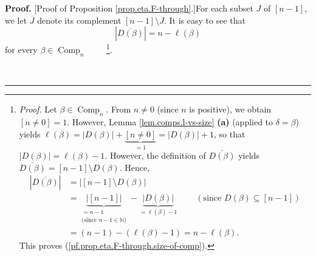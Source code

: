 \documentclass[numbers=enddot,12pt,final,onecolumn,notitlepage]{scrartcl}%
\theoremstyle{definition}
\newenvironment{proof}[1][Proof]{\noindent\textbf{#1.} }{\ \rule{0.5em}{0.5em}}
\newenvironment{vershort}{}{}
\begin{document}
\begin{vershort}


\begin{proof}
[Proof of Proposition \ref{prop.eta.F-through}.]For each subset $J$ of
$\left[  n-1\right]  $, we let $\overline{J}$ denote its complement $\left[
n-1\right]  \setminus J$. It is easy to see that%
\begin{equation}
\left\vert \overline{D\left(  \beta\right)  }\right\vert =n-\ell\left(
\beta\right)  \label{pf.prop.eta.F-through.size-of-comp}%
\end{equation}
for every $\beta\in\operatorname*{Comp}\nolimits_{n}$%
\ \ \ \ \footnote{\textit{Proof.} Let $\beta\in\operatorname*{Comp}%
\nolimits_{n}$. From $n\neq0$ (since $n$ is positive), we obtain $\left[
n\neq0\right]  =1$. However, Lemma \ref{lem.comps.l-vs-size} \textbf{(a)}
(applied to $\delta=\beta$) yields $\ell\left(  \beta\right)  =\left\vert
D\left(  \beta\right)  \right\vert +\underbrace{\left[  n\neq0\right]  }%
_{=1}=\left\vert D\left(  \beta\right)  \right\vert +1$, so that $\left\vert
D\left(  \beta\right)  \right\vert =\ell\left(  \beta\right)  -1$. However,
the definition of $\overline{D\left(  \beta\right)  }$ yields $\overline
{D\left(  \beta\right)  }=\left[  n-1\right]  \setminus D\left(  \beta\right)
$. Hence,%
\begin{align*}
\left\vert \overline{D\left(  \beta\right)  }\right\vert  &  =\left\vert
\left[  n-1\right]  \setminus D\left(  \beta\right)  \right\vert \\
&  =\underbrace{\left\vert \left[  n-1\right]  \right\vert }%
_{\substack{=n-1\\\text{(since }n-1\in\mathbb{N}\text{)}}%
}-\underbrace{\left\vert D\left(  \beta\right)  \right\vert }_{=\ell\left(
\beta\right)  -1}\ \ \ \ \ \ \ \ \ \ \left(  \text{since }D\left(
\beta\right)  \subseteq\left[  n-1\right]  \right) \\
&  =\left(  n-1\right)  -\left(  \ell\left(  \beta\right)  -1\right)
=n-\ell\left(  \beta\right)  .
\end{align*}
This proves (\ref{pf.prop.eta.F-through.size-of-comp}).}.


\end{proof}
\end{vershort}
\end{document}

